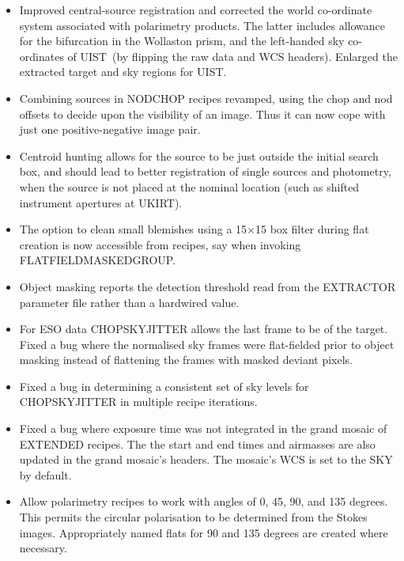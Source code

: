 \documentclass[twoside,11pt]{article}
\newcommand{\htmladdnormallink}[2]{#1}
\newcommand{\htmlref}[2]{#1}
\renewcommand{\_}{\texttt{\symbol{95}}}
\newcommand{\UIST}{\htmladdnormallink{UIST}{http://www.jach.hawaii.edu/JACpublic/UKIRT/instruments/uist/uist.html}}
\begin{document}
\begin{itemize}
   \item Improved central-source registration and corrected the world
   co-ordinate system associated with polarimetry products.  The latter
   includes allowance for the bifurcation in the Wollaston prism, and
   the left-handed sky co-ordinates of \UIST\ (by flipping the raw data
   and WCS headers).  Enlarged the extracted target and sky regions
   for UIST.

   \item Combining sources in NOD\_CHOP recipes revamped, using the
   chop and nod offsets to decide upon the visibility of an image.
   Thus it can now cope with just one positive-negative image pair.
   
  \item Centroid hunting allows for the source to be just outside
   the initial search box, and should lead to better registration
   of single sources and photometry, when the source is not placed
   at the nominal location (such as shifted instrument apertures at
   UKIRT).

   \item The option to clean small blemishes using a 15$\times$15 box
   filter during flat creation is now accessible from recipes, say when
   invoking \_FLAT\_FIELD\_MASKED\_GROUP\_.

   \item Object masking reports the detection threshold read from the
   EXTRACTOR parameter file rather than a hardwired value.

   \item For ESO data \htmlref{CHOP\_SKY\_JITTER}{CHOP\_SKY\_JITTER}
   allows the last frame to be of the target.  Fixed a bug where the
   normalised sky frames were flat-fielded prior to object masking
   instead of flattening the frames with masked deviant pixels.

   \item Fixed a bug in determining a consistent set of sky levels for
   \htmlref{CHOP\_SKY\_JITTER}{CHOP\_SKY\_JITTER} in multiple recipe
   iterations.

   \item Fixed a bug where exposure time was not integrated in the
   grand mosaic of EXTENDED recipes.  The the start and end times and
   airmasses are also updated in the grand mosaic's headers.  The
   mosaic's WCS is set to the SKY by default.

   \item Allow polarimetry recipes to work with angles of 0, 45, 90,
   and 135 degrees.  This permits the circular polarisation to be
   determined from the Stokes images.  Appropriately named flats for
   90 and 135 degrees are created where necessary.


\end{itemize}
\end{document}

